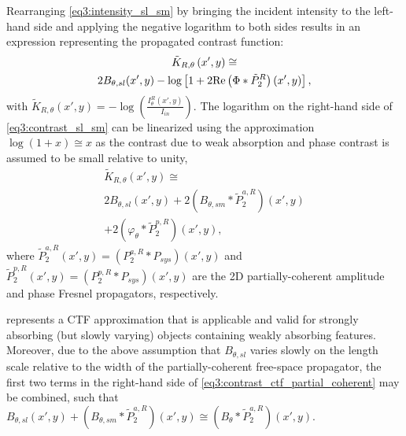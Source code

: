 \documentclass[twocolumn, switch]{article} %
\begin{document}
Rearranging \cref{eq3:intensity_sl_sm} by bringing the incident intensity to the left-hand side and applying the negative logarithm to both sides results in an expression representing the propagated contrast function: 
\begin{multline}
    \label{eq3:contrast_sl_sm}
    {\tilde K_{R,\theta }}\left( {x',y} \right) \cong \\2{B_{\theta ,sl}}(x',y) - \log \left[ {1 + 2{\mathop{\rm Re}\nolimits} \left( {\Phi  * \tilde P_2^R} \right)\left( {x',y} \right)} \right],
\end{multline}
with ${\tilde K_{R,\theta }}\left( {x',y} \right) =  - \log \left( {\frac{{I_\theta ^R\left( {x',y} \right)}}{{{I_{in}}}}} \right).$
The logarithm on the right-hand side of \cref{eq3:contrast_sl_sm} can be linearized using the approximation $\log (1 + x) \cong x$ as the contrast due to weak absorption and phase contrast is assumed to be small relative to unity,
\begin{multline}
    \label{eq3:contrast_ctf_partial_coherent}
    {\tilde K_{R,\theta }}\left( {x',y} \right) \cong \\2{B_{\theta ,sl}}(x',y) + 2\left( {{B_{\theta ,sm}} * \tilde P_2^{a,R}} \right)\left( {x',y} \right) \\+ 2\left( {{\varphi _\theta } * \tilde P_2^{p,R}} \right)\left( {x',y} \right),
\end{multline}
where $\tilde P_2^{a,R}\left( {x',y} \right) = \left( {P_2^{a,R} * {P_{sys}}} \right)\left( {x',y} \right)$ and   $\tilde P_2^{p,R}\left( {x',y} \right) = \left( {P_2^{p,R} * {P_{sys}}} \right)\left( {x',y} \right)$ are the 2D partially-coherent amplitude and phase Fresnel propagators, respectively.

 represents a CTF approximation that is applicable and valid for strongly absorbing (but slowly varying) objects containing weakly absorbing features. Moreover, due to the above assumption that ${B_{\theta ,sl}}$ varies slowly on the length scale relative to the width of the partially-coherent free-space propagator, the first two terms in the right-hand side of \cref{eq3:contrast_ctf_partial_coherent} may be combined, such that ${B_{\theta ,sl}}(x',y) + \left( {{B_{\theta ,sm}} * \tilde P_2^{a,R}} \right)\left( {x',y} \right) \cong \left( {{B_\theta } * \tilde P_2^{a,R}} \right)\left( {x',y} \right)$. 
\end{document}
